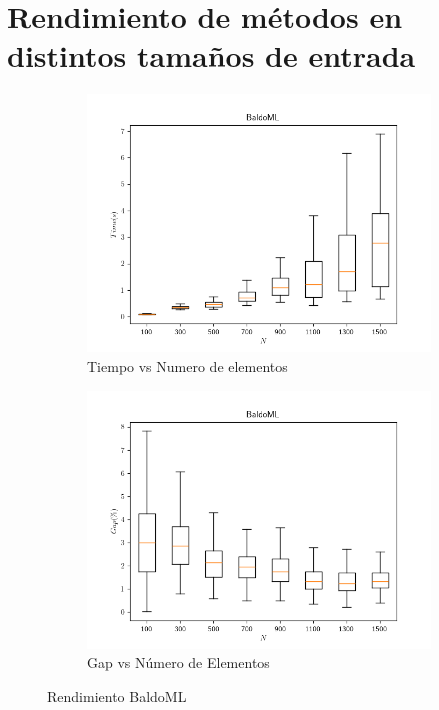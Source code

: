 \documentclass[spanish, a4paper, 12pt, openany,final]{book}
\begin{document}
\section{Rendimiento de métodos en distintos tamaños de entrada}
\begin{figure}[h]
	\centering
	\begin{subfigure}{.5\textwidth}
		\includegraphics[width=1\linewidth]{graphs/BaldoML_time.png}
		\caption{Tiempo vs Numero de elementos}
	\end{subfigure}%
	\begin{subfigure}{.5\textwidth}
		\includegraphics[width=1\linewidth]{graphs/BaldoML_gap.png}
		\caption{Gap vs Número de Elementos}
	\end{subfigure}%
	\caption{Rendimiento BaldoML}
	\label{fig:perf_baldoml}
\end{figure}
\end{document}
